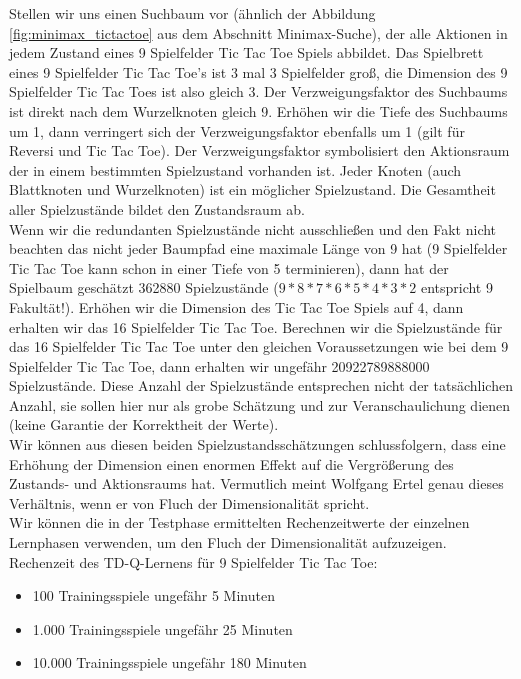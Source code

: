 Stellen wir uns einen Suchbaum vor (ähnlich der Abbildung \ref{fig:minimax_tictactoe} aus dem Abschnitt Minimax-Suche), der alle Aktionen in jedem Zustand eines 9 Spielfelder Tic Tac Toe Spiels abbildet. Das Spielbrett eines 9 Spielfelder Tic Tac Toe's ist 3 mal 3 Spielfelder groß, die Dimension des 9 Spielfelder Tic Tac Toes ist also gleich 3. Der Verzweigungsfaktor des Suchbaums ist direkt nach dem Wurzelknoten gleich 9. Erhöhen wir die Tiefe des Suchbaums um 1, dann verringert sich der Verzweigungsfaktor ebenfalls um 1 (gilt für Reversi und Tic Tac Toe). Der Verzweigungsfaktor symbolisiert den Aktionsraum der in einem bestimmten Spielzustand vorhanden ist. Jeder Knoten (auch Blattknoten und Wurzelknoten) ist ein möglicher Spielzustand. Die Gesamtheit aller Spielzustände bildet den Zustandsraum ab. \\

Wenn wir die redundanten Spielzustände nicht ausschließen und den Fakt nicht beachten das nicht jeder Baumpfad eine maximale Länge von 9 hat (9 Spielfelder Tic Tac Toe kann schon in einer Tiefe von 5 terminieren), dann hat der Spielbaum geschätzt 362880 Spielzustände ($9 * 8 * 7 * 6 * 5 * 4 * 3 * 2$ entspricht 9 Fakultät!). Erhöhen wir die Dimension des Tic Tac Toe Spiels auf 4, dann erhalten wir das 16 Spielfelder Tic Tac Toe. Berechnen wir die Spielzustände für das 16 Spielfelder Tic Tac Toe unter den gleichen Voraussetzungen wie bei dem 9 Spielfelder Tic Tac Toe, dann erhalten wir ungefähr 20922789888000 Spielzustände. Diese Anzahl der Spielzustände entsprechen nicht der tatsächlichen Anzahl, sie sollen hier nur als grobe Schätzung und zur Veranschaulichung dienen (keine Garantie der Korrektheit der Werte). \\

Wir können aus diesen beiden Spielzustandsschätzungen schlussfolgern, dass eine Erhöhung der Dimension einen enormen Effekt auf die Vergrößerung des Zustands- und Aktionsraums hat. Vermutlich meint Wolfgang Ertel genau dieses Verhältnis, wenn er von Fluch der Dimensionalität spricht. \\

Wir können die in der Testphase ermittelten Rechenzeitwerte der einzelnen Lernphasen verwenden, um den Fluch der Dimensionalität aufzuzeigen. \\

Rechenzeit des TD-Q-Lernens für 9 Spielfelder Tic Tac Toe: 
\begin{itemize}
\item 100 Trainingsspiele ungefähr 5 Minuten 
\item 1.000 Trainingsspiele ungefähr 25 Minuten
\item 10.000 Trainingsspiele ungefähr 180 Minuten
\end{itemize}

